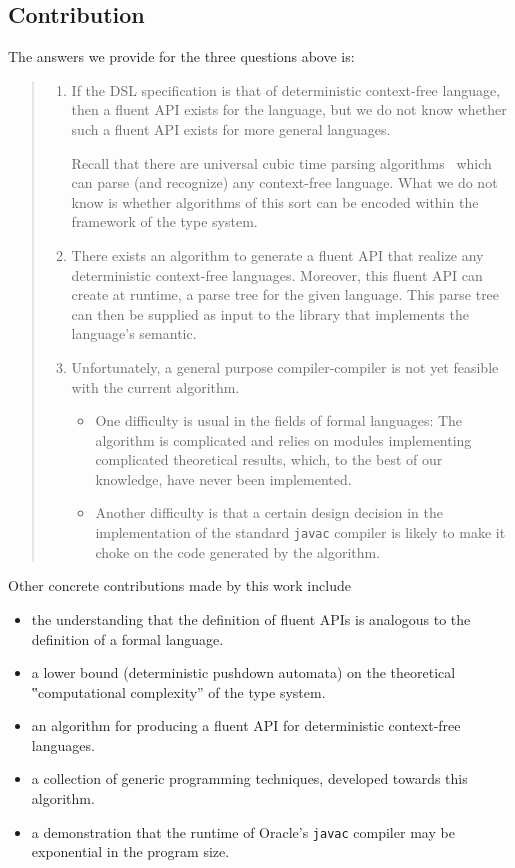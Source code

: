 \subsection{Contribution}
The answers we provide for the three questions above is:
\begin{quote}
  \begin{enumerate}
  \item If the DSL specification is that of deterministic context-free
    language, then a fluent API exists for the language, but we do not know
    whether such a fluent API exists for more general languages.
  \par
  Recall that there are universal cubic time parsing 
  algorithms~\cite{Cocke:1969,Earley:1970,Younger:1967} which can parse (and recognize) any
  context-free language. What we do not know is whether algorithms of this sort
  can be encoded within the framework of the \Java type system.
  \item
  There exists an algorithm to generate a fluent API that realize any
  deterministic context-free languages.  Moreover, this fluent API can create
  at runtime, a parse tree for the given language.  This parse tree can then be
  supplied as input to the library that implements the language's semantic.
  \item
  Unfortunately, a general purpose compiler-compiler
  is not yet feasible with the current algorithm.
  \begin{itemize}
    \item One difficulty is usual in the fields of formal languages: 
      The algorithm is complicated and relies on
      modules implementing complicated theoretical results, which, to the best of our
      knowledge, have never been implemented.
    \item Another difficulty is that a certain design decision in the
      implementation of the standard \texttt{javac} compiler is likely to make it choke on the
      \Java code generated by the algorithm.
  \end{itemize}
  \end{enumerate}
\end{quote}

Other concrete contributions made by this work include
\begin{itemize}
  \item the understanding that the definition of fluent APIs is analogous to
      the definition of a formal language.
  \item a lower bound (deterministic pushdown automata)
    on the theoretical ‟computational complexity” of the \Java type system.
  \item an algorithm for producing a fluent API for deterministic context-free languages.
  \item a collection of generic programming techniques, developed towards this algorithm.
  \item a demonstration that the runtime of Oracle's \texttt{javac} compiler may be exponential in the program size.
\end{itemize}

